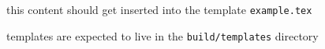 \documentclass[12pt]{article}
\begin{document}
this content should get inserted into the template \verb|example.tex|

templates are expected to live in the \verb|build/templates| directory
\end{document}
